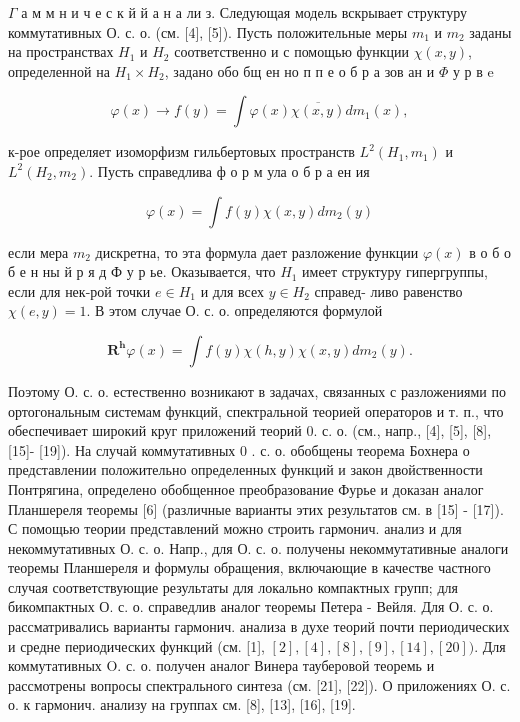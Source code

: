 \documentclass[10pt]{article}
\begin{document}
$\Gamma$ а м м н и ч е с к й й а н а ли з. Следующая модель вскрывает структуру коммутативных О. с. $о$. (см. [4], [5]). Пусть положительные меры $m_{1}$ и $m_{2}$ заданы на пространствах $H_{1}$ и $H_{2}$ соответственно и с помощью функции $\chi(x, y)$, определенной на $H_{1} \times H_{2}$, задано обо бщ ен но п п е о б р а зов ан и $\Phi$ у р в e



\[

\varphi(x) \rightarrow f(y)=\int \varphi(x) \overline{\chi(x, y)} d m_{1}(x),

\]



к-рое определяет изоморфизм гильбертовых пространств $L^{2}\left(H_{1}, m_{1}\right)$ и $L^{2}\left(H_{2}, m_{2}\right)$. Пусть справедлива ф о р м ула о б р а ен ия



\[

\varphi(x)=\int f(y) \chi(x, y) d m_{2}(y)

\]



если мера $m_{2}$ дискретна, то эта формула дает разложение функции $\varphi(x)$ в о б о б е н ны й р я д Ф у р ье. Оказывается, что $H_{1}$ имеет структуру гипергруппы, если для нек-рой точки $e \in H_{1}$ и для всех $y \in H_{2}$ справед- ливо равенство $\chi(e, y)=1$. В этом случае О. с. о. определяются формулой



\[

\boldsymbol{R}^{\boldsymbol{h}} \varphi(x)=\int f(y) \chi(h, y) \chi(x, y) d m_{2}(y) .

\]



Поэтому О. с. о. естественно возникают в задачах, связанных с разложениями по ортогональным системам функций, спектральной теорией операторов и т. п., что обеспечивает широкий круг приложений теорий 0. с. о. (см., напр., [4], [5], [8], [15]- [19]). На случай коммутативных 0 . с. о. обобщены теорема Бохнера о представлении положительно определенных функций и закон двойственности Понтрягина, определено обобщенное преобразование Фурье и доказан аналог Планшереля теоремы [6] (различные варианты этих результатов см. в [15] - [17]). С помощью теории представлений можно строить гармонич. анализ и для некоммутативных О. с. о. Напр., для О. с. о. получены некоммутативные аналоги теоремы Планшереля и формулы обращения, включающие в качестве частного случая соответствующие результаты для локально компактных групп; для бикомпактных О. с. о. справедлив аналог теоремы Петера - Вейля. Для О. с. о. рассматривались варианты гармонич. анализа в духе теорий почти периодических и средне периодических функций (см. [1], $[2],[4],[8],[9],[14],[20])$. Для коммутативных O. с. о. получен аналог Винера тауберовой теоремь и рассмотрены вопросы спектрального синтеза (см. [21], [22]). О приложениях О. с. о. к гармонич. анализу на группах см. [8], [13], [16], [19].
\end{document}
